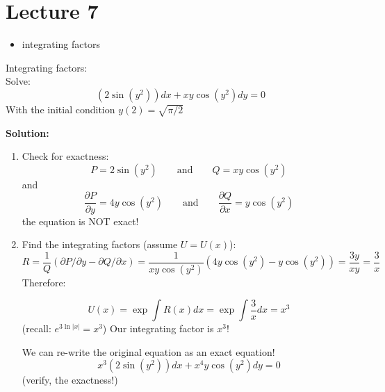 \chapter*{Lecture 7}
\begin{recall}{}{}
\begin{itemize}
\item integrating factors
\end{itemize}
\end{recall}









\begin{exmp}{Integrating factors:}\\
Solve:
\begin{equation*}
(2\sin(y^2))dx+xy\cos(y^2)dy=0
\end{equation*}
With the initial condition $y(2)=\sqrt{\pi/2}$

\textbf{Solution:}
\begin{enumerate}
\item Check for exactness: 
\begin{equation*}
P=2 \sin(y^2) \qquad \text{and} \qquad Q=xy\cos(y^2)
\end{equation*}
and
\begin{equation*}
\frac{\partial P}{\partial y}=4y\cos(y^2)\qquad \text{and} \qquad \frac{\partial Q}{\partial x}=y\cos(y^2)
\end{equation*}
the equation is NOT exact!
\item Find the integrating factors (assume $U=U(x)$):
\begin{equation*}
R=\frac{1}{Q}\left(\partial P/\partial y-\partial Q/\partial x\right)=\frac{1}{xy\cos(y^2)}\left(4y\cos(y^2)-y\cos(y^2)\right)=\frac{3y}{xy}=\frac{3}{x}
\end{equation*}
Therefore:


\begin{equation*}
U(x)=\exp \int R(x)dx=\exp{\int\frac{3}{x}dx} ={x}^3
\end{equation*}
(recall: $e^{3\ln\left|x\right|}=x^3$) Our integrating factor is ${x}^3$!

We can re-write the original equation as an exact equation!
\begin{equation*}
{x}^3(2\sin(y^2))dx+{x}^4y\cos(y^2)dy=0
\end{equation*}
(verify, the exactness!)


\end{enumerate}
\end{exmp}
